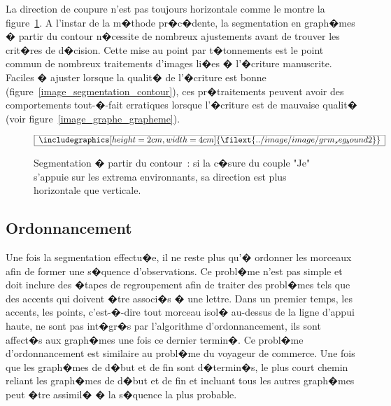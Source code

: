 La direction de coupure n'est pas toujours horizontale comme le montre la figure~\ref{image_segmentation_contour2}. A l'instar de la m�thode pr�c�dente, la segmentation en graph�mes � partir du contour n�cessite de nombreux ajustements avant de trouver les crit�res de d�cision. Cette mise au point par t�tonnements est le point commun de nombreux traitements d'images li�es � l'�criture manuscrite. Faciles � ajuster lorsque la qualit� de l'�criture est bonne (figure~\ref{image_segmentation_contour}), ces pr�traitements peuvent avoir des comportements tout-�-fait erratiques lorsque l'�criture est de mauvaise qualit� (voir figure~\ref{image_graphe_grapheme}).


            \begin{figure}[ht]
        $$\frame{$\begin{array}[c]{c}\includegraphics[height=2cm, width=4cm]
        {\filext{../image/image/grm_seg_bound2}}\end{array}$}$$
        \caption{    Segmentation � partir du contour~: si la c�sure du couple "Je" s'appuie sur les extrema 
                            environnants, sa direction est plus horizontale que verticale.}
        \label{image_segmentation_contour2}
            \end{figure}







            
            
\subsection{Ordonnancement}
\label{image_ordonnancement}

Une fois la segmentation effectu�e, il ne reste plus qu'� ordonner les morceaux afin de former une s�quence d'observations. Ce probl�me n'est pas simple et doit inclure des �tapes de regroupement afin de traiter des probl�mes tels que des accents qui doivent �tre associ�s � une lettre. Dans un premier temps, les accents, les points, c'est-�-dire tout morceau isol� au-dessus de la ligne d'appui haute, ne sont pas int�gr�s par l'algorithme d'ordonnancement, ils sont affect�s aux graph�mes une fois ce dernier termin�. Ce probl�me d'ordonnancement est similaire au probl�me du voyageur de commerce. Une fois que les graph�mes de d�but et de fin sont d�termin�s, le plus court chemin reliant les graph�mes de d�but et de fin et incluant tous les autres graph�mes peut �tre assimil� � la s�quence la plus probable.








